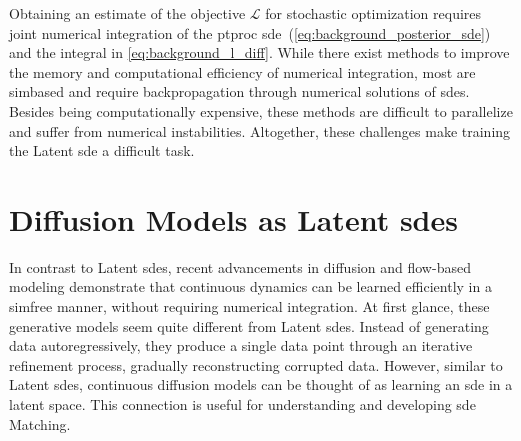 \documentclass{article}
\def\L{\mathcal{L}}
\theoremstyle{plain}
\theoremstyle{definition}
\theoremstyle{remark}
\begin{document}
Obtaining an estimate of the objective $\L$ for stochastic optimization requires joint numerical integration of the \gls{ptproc} \gls{sde}~(\cref{eq:background_posterior_sde})  and the integral in \cref{eq:background_l_diff}. While there exist methods to improve the memory and computational efficiency of numerical integration, most are \gls{simbased} and require backpropagation through numerical solutions of \glspl{sde}. Besides being computationally expensive, these methods are difficult to parallelize and suffer from numerical instabilities. Altogether, these challenges make training the Latent \gls{sde} a difficult task.


\section{Diffusion Models as Latent \glspl{sde}}
\label{sec:diffusion}


In contrast to Latent \glspl{sde}, recent advancements in diffusion and flow-based modeling demonstrate that continuous dynamics can be learned efficiently in a \gls{simfree} manner, without requiring numerical integration. At first glance, these generative models seem quite different from Latent \glspl{sde}. Instead of generating data autoregressively, they produce a single data point through an iterative refinement process, gradually reconstructing corrupted data. However, similar to Latent \glspl{sde}, continuous diffusion models can be thought of as learning an \gls{sde} in a latent space. This connection is useful for understanding and developing \gls{sde} Matching.
\end{document}
